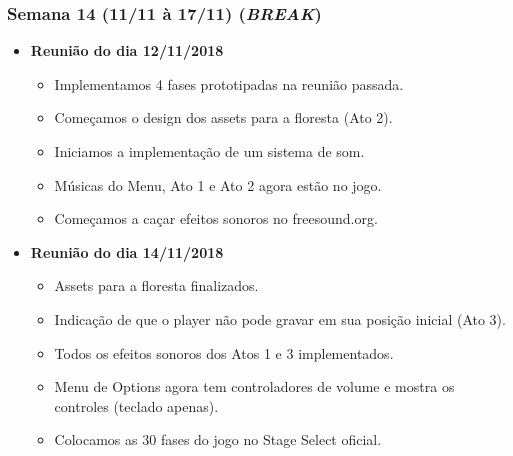 \documentclass[a4paper, 11pt]{article}
\begin{document}
\subsubsection{Semana 14 (11/11 à 17/11) (\textit{BREAK})}
	\begin{itemize} 
		\item \textbf{Reunião do dia 12/11/2018}

		\begin{itemize}

    		\item Implementamos 4 fases prototipadas na reunião passada.
    		\item Começamos o design dos assets para a floresta (Ato 2).
    		\item Iniciamos a implementação de um sistema de som.
    		\item Músicas do Menu, Ato 1 e Ato 2 agora estão no jogo.
    		\item Começamos a caçar efeitos sonoros no freesound.org.

   		\end{itemize}

		\item \textbf{Reunião do dia 14/11/2018}

		\begin{itemize}

    		\item Assets para a floresta finalizados.
    		\item Indicação de que o player não pode gravar em sua posição inicial (Ato 3).
    		\item Todos os efeitos sonoros dos Atos 1 e 3 implementados.
    		\item Menu de Options agora tem controladores de volume e mostra os controles (teclado apenas).
    		\item Colocamos as 30 fases do jogo no Stage Select oficial.

		\end{itemize}

	\end{itemize}
\end{document}
